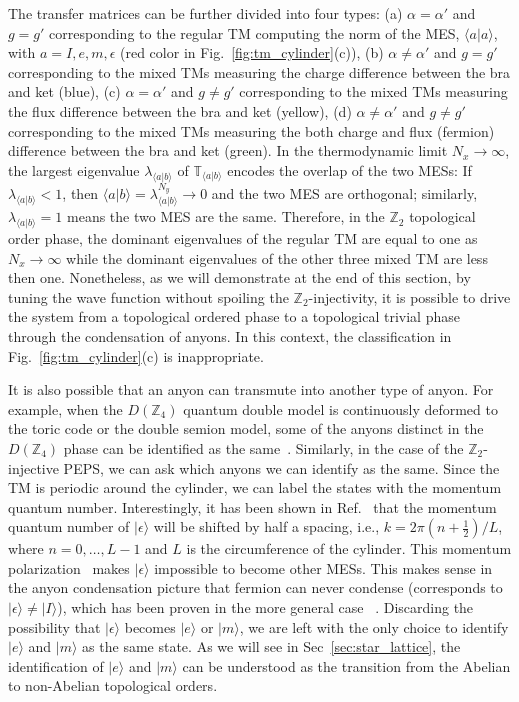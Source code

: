 \documentclass{ntuthesis}
\newcommand{\citep}{\cite}
\begin{document}
The transfer matrices can be further divided into four types:
 (a) $\alpha = \alpha'$ and $g=g'$ corresponding to the regular TM computing the norm of the MES, ${\langle a | a \rangle}$, with $ a = I,e,m, \epsilon $ (red color in Fig.~\ref{fig:tm_cylinder}(c)), 
 (b) $\alpha \neq  \alpha'$ and $g=g'$ corresponding to the mixed TMs measuring the charge difference between the bra and ket (blue), 
 (c) $\alpha =  \alpha'$ and $g \neq g'$ corresponding to the mixed TMs measuring the flux difference between the bra and ket  (yellow), 
 (d) $\alpha \neq  \alpha'$ and $g \neq g'$ corresponding to the mixed TMs measuring the both charge and flux (fermion) difference between the bra and ket (green).  
%
In the thermodynamic limit $N_x \rightarrow \infty$, the largest eigenvalue $\lambda_{\langle a|b \rangle}$  of  $\mathbb{ T}_{\langle a|b \rangle}$ encodes the overlap of the two MESs: 
%
If $\lambda_{\langle a|b \rangle} < 1$, then $\langle a|b \rangle = \lambda_{\langle a|b \rangle} ^{N_y} \rightarrow 0$ and the two MES are orthogonal; similarly, $\lambda_{\langle a|b \rangle} = 1$ means the two MES are the same. 
%
Therefore, in the $\mathbb{Z}_2$ topological order phase, the dominant eigenvalues of the regular TM are equal to one as $N_x \rightarrow \infty$ while the dominant eigenvalues of the other three mixed TM are less then one.
%
Nonetheless, as we will demonstrate at the end of this section, by tuning the wave function without spoiling the $\mathbb{Z}_2$-injectivity, it is possible to drive the system from a topological ordered phase to a topological trivial phase through the condensation of anyons. In this context, the classification in Fig.~\ref{fig:tm_cylinder}(c) is inappropriate.


%
It is also possible that an anyon can transmute into another type of anyon. 
%
For example, when the $D(\mathbb{Z}_4)$ quantum double model is continuously deformed to the toric code or the double semion model, some of the anyons distinct in the $D(\mathbb{Z}_4)$ phase can be identified as the same~\cite{2017_anyon_condensates, 2017_Z4_anyon}. 
%
Similarly, in the case of the $\mathbb{Z}_2$-injective PEPS, we can ask which anyons we can identify as the same.  
%
Since the TM is periodic around  the cylinder, we can label the states with the momentum quantum number.
%
Interestingly, it has been shown in Ref.~\citep{Haegeman_2015} that the momentum quantum number of $|\epsilon\rangle$ will be shifted by half a spacing, i.e., $k = 2\pi(n+\frac{1}{2})/L$, where $n = 0,\ldots ,L-1$ and $L$ is the circumference of the cylinder. 
%
This momentum polarization~\citep{2013_momentum_polarization} makes $|\epsilon\rangle$ impossible to become other MESs.
This makes sense in the anyon condensation picture that fermion can never condense (corresponds to $|\epsilon \rangle \neq |I\rangle$), which has been proven in the more general case ~\citep{2017_anyon_condensates}.
Discarding the possibility that  $|\epsilon\rangle$ becomes $|e\rangle$ or $|m\rangle$, we are left with the only choice to identify $|e\rangle$ and $|m\rangle$ as the same state. 
 As we will see in Sec~\ref{sec:star_lattice}, the identification of $|e\rangle$ and $|m\rangle$ can be understood as the transition from the Abelian  to non-Abelian topological orders.
\end{document}
